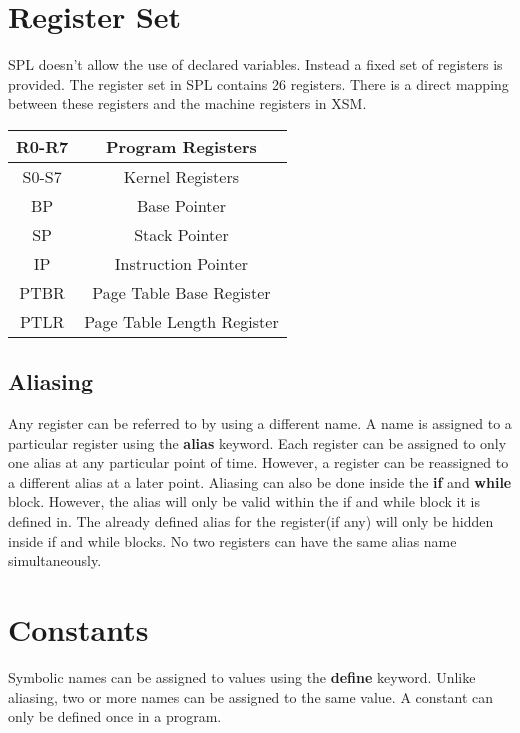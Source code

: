 \documentclass[11pt]{article}
\begin{document}
\section{Register Set}

SPL doesn't allow the use of declared variables. Instead a fixed set of registers is provided. The register set in SPL contains 26 registers. There is a direct mapping between these registers and the machine registers in XSM.   \\

\begin{center}
\begin{tabular}{| c | c | }
\hline
R0-R7 & Program Registers \\
\hline
S0-S7 & Kernel Registers \\
\hline
BP 		& Base Pointer \\
\hline
SP		& Stack Pointer \\
\hline
IP		& Instruction Pointer \\
\hline
PTBR	& Page Table Base Register \\
\hline
PTLR & Page Table Length Register \\
\hline
\end{tabular}
\end{center}

\subsection{Aliasing}
Any register can be referred to by using a different name. A name is assigned to a particular register using the \textbf{alias} keyword. Each register can be assigned to only one alias at any particular point of time. However, a  register can be reassigned to a different alias at a later point. Aliasing can also be done inside the \textbf{if} and \textbf{while} block. However, the alias will only be valid within the if and while block it is defined in. The already defined alias for the register(if any) will only be hidden inside if and while blocks. No two registers can have the same alias name simultaneously.



\section{Constants}
Symbolic names can be assigned to values using the \textbf{define} keyword. Unlike aliasing, two or more names can be assigned to the same value. A constant can only be defined once in a program.
	
\end{document}
